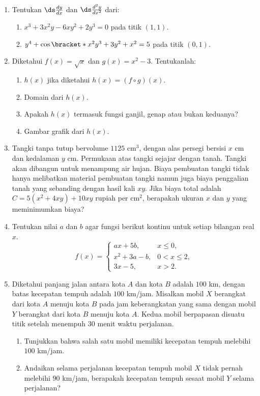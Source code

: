 \begin{enumerate}[leftmargin=*, label={\arabic*}.]
\item Tentukan $\ds\frac{dy}{dx}$ dan $\ds\frac{d^{2}y}{dx^{2}}$ dari:
\begin{enumerate}[label={\alph*}.]
    \item $x^{3}+3x^{2}y-6xy^{2}+2y^{3}=0$ pada titik $(1,1)$.
    \item $y^{4}+\cos\bracket*{x^{2}y^{3}}+3y^{2}+x^{2}=5$ pada titik $(0,1)$.
\end{enumerate}
\item Diketahui $f(x)=\sqrt{x}$ dan $g(x)=x^{2}-3$. Tentukanlah:
\begin{enumerate}[label={\alph*}.]
    \item $h(x)$ jika diketahui $h(x)=(f \circ g)(x)$.
    \item Domain dari $h(x)$.
    \item Apakah $h(x)$ termasuk fungsi ganjil, genap atau bukan keduanya?
    \item Gambar grafik dari $h(x)$.
\end{enumerate}
\item Tangki tanpa tutup bervolume $1125$ cm$^3$, dengan alas persegi bersisi $x$ 
cm dan kedalaman $y$ cm. Permukaan atas tangki sejajar dengan tanah. Tangki akan 
dibangun untuk menampung air hujan. Biaya pembuatan tangki tidak hanya melibatkan 
material pembuatan tangki namun juga biaya penggalian tanah yang sebanding dengan 
hasil kali $xy$. Jika biaya total adalah $C=5(x^{2}+4xy)+10xy$ rupiah per cm$^2$, 
berapakah ukuran $x$ dan $y$ yang meminimumkan biaya?
\item Tentukan nilai $a$ dan $b$ agar fungsi berikut kontinu untuk setiap bilangan 
real $x$.
\[
    f(x)=
    \begin{cases}
        ax+5b, &x \leq 0,\\
        x^2+3a-b, &0 < x \leq 2,\\
        3x-5, &x > 2.
    \end{cases}
\]
\item Diketahui panjang jalan antara kota $A$ dan kota $B$ adalah $100$ km, dengan 
batas kecepatan tempuh adalah $100$ km/jam. Misalkan mobil $X$ berangkat dari kota 
$A$ menuju kota $B$ pada jam keberangkatan yang sama dengan mobil $Y$ berangkat 
dari kota $B$ menuju kota $A$. Kedua mobil berpapasan disuatu titik setelah 
menempuh 30 menit waktu perjalanan.
\begin{enumerate}[label={\alph*}.]
    \item Tunjukkan bahwa salah satu mobil memiliki kecepatan tempuh melebihi $100$ 
    km/jam.
    \item  Andaikan selama perjalanan kecepatan tempuh mobil $X$ tidak pernah melebihi
    $90$ km/jam, berapakah kecepatan tempuh sesaat mobil $Y$ selama perjalanan?
\end{enumerate}
\end{enumerate}
